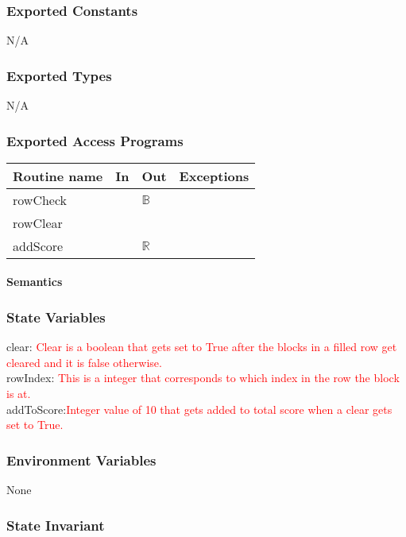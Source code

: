 \documentclass[12pt]{article}
\begin{document}
\subsubsection*{Exported Constants}
N/A
\subsubsection*{Exported Types}

N/A

\subsubsection* {Exported Access Programs}

\begin{tabular}{| l | l | l | l |}
\hline
\textbf{Routine name} & \textbf{In} & \textbf{Out} & \textbf{Exceptions}\\
\hline
rowCheck & & $\mathbb{B}$ & \\
\hline
rowClear & &  & \\
\hline
addScore & & $\mathbb{R}$ & \\
\hline
\end{tabular}

\paragraph* {Semantics}

\subsubsection*{State Variables}

clear: \textcolor{red}{Clear is a boolean that gets set to True after the blocks in a filled row get cleared and it is false otherwise.}\\ rowIndex: \textcolor{red}{This is a integer that corresponds to which index in the row the block is at.}\\ addToScore:\textcolor{red}{Integer value of 10 that gets added to total score when a clear gets set to True.}

\subsubsection*{Environment Variables}

None

\subsubsection*{State Invariant}
\end{document}
